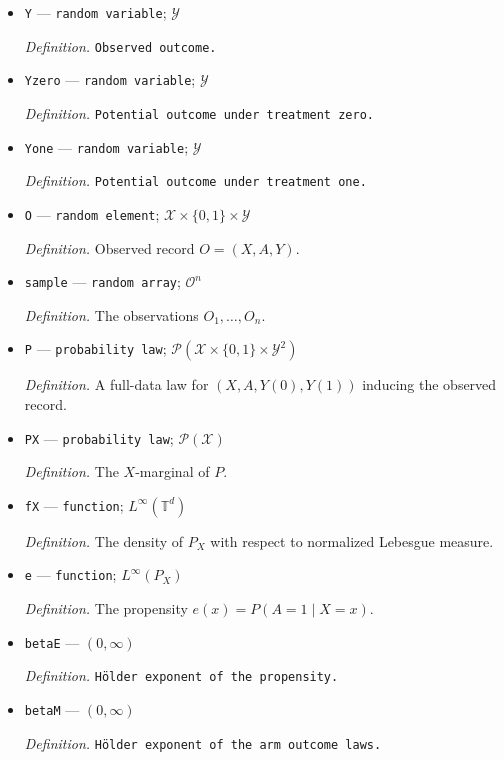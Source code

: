 \documentclass{article}
\begin{document}
\begin{itemize}
  \item \texttt{Y} --- \texttt{random variable}; \(\mathcal Y\)
  \par\smallskip\noindent\emph{Definition.} \texttt{Observed outcome.}
  \item \texttt{Yzero} --- \texttt{random variable}; \(\mathcal Y\)
  \par\smallskip\noindent\emph{Definition.} \texttt{Potential outcome under treatment zero.}
  \item \texttt{Yone} --- \texttt{random variable}; \(\mathcal Y\)
  \par\smallskip\noindent\emph{Definition.} \texttt{Potential outcome under treatment one.}
  \item \texttt{O} --- \texttt{random element}; \(\mathcal X\times\{0,1\}\times\mathcal Y\)
  \par\smallskip\noindent\emph{Definition.} Observed record \(O=(X,A,Y)\).
  \item \texttt{sample} --- \texttt{random array}; \(\mathcal O^{n}\)
  \par\smallskip\noindent\emph{Definition.} The observations \(O_1,\ldots,O_n\).
  \item \texttt{P} --- \texttt{probability law}; \(\mathcal P(\mathcal X\times\{0,1\}\times\mathcal Y^2)\)
  \par\smallskip\noindent\emph{Definition.} A full-data law for \((X,A,Y(0),Y(1))\) inducing the observed record.
  \item \texttt{PX} --- \texttt{probability law}; \(\mathcal P(\mathcal X)\)
  \par\smallskip\noindent\emph{Definition.} The \(X\)-marginal of \(P\).
  \item \texttt{fX} --- \texttt{function}; \(L^\infty(\mathbb T^d)\)
  \par\smallskip\noindent\emph{Definition.} The density of \(P_X\) with respect to normalized Lebesgue measure.
  \item \texttt{e} --- \texttt{function}; \(L^\infty(P_X)\)
  \par\smallskip\noindent\emph{Definition.} The propensity \(e(x)=P(A=1\mid X=x)\).
  \item \texttt{betaE} --- \((0,\infty)\)
  \par\smallskip\noindent\emph{Definition.} \texttt{Hölder exponent of the propensity.}
  \item \texttt{betaM} --- \((0,\infty)\)
  \par\smallskip\noindent\emph{Definition.} \texttt{Hölder exponent of the arm outcome laws.}

\end{itemize}
\end{document}
